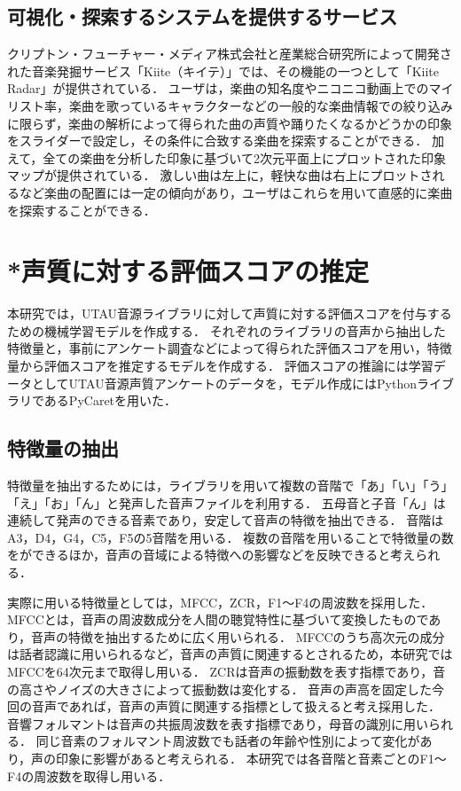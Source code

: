 \documentclass[a4j,8pt,twocolumn]{extarticle}
\begin{document}
\subsection{可視化・探索するシステムを提供するサービス}
クリプトン・フューチャー・メディア株式会社と産業総合研究所によって開発された音楽発掘サービス「Kiite（キイテ）」では、その機能の一つとして「Kiite Radar」が提供されている\cite{kiite}．
ユーザは，楽曲の知名度やニコニコ動画上でのマイリスト率，楽曲を歌っているキャラクターなどの一般的な楽曲情報での絞り込みに限らず，楽曲の解析によって得られた曲の声質や踊りたくなるかどうかの印象をスライダーで設定し，その条件に合致する楽曲を探索することができる．
加えて，全ての楽曲を分析した印象に基づいて2次元平面上にプロットされた印象マップが提供されている．
激しい曲は左上に，軽快な曲は右上にプロットされるなど楽曲の配置には一定の傾向があり，ユーザはこれらを用いて直感的に楽曲を探索することができる．

\section{*声質に対する評価スコアの推定}
本研究では，UTAU音源ライブラリに対して声質に対する評価スコアを付与するための機械学習モデルを作成する．
それぞれのライブラリの音声から抽出した特徴量と，事前にアンケート調査などによって得られた評価スコアを用い，特徴量から評価スコアを推定するモデルを作成する．
評価スコアの推論には学習データとしてUTAU音源声質アンケートのデータを，モデル作成にはPythonライブラリであるPyCaretを用いた．

\subsection{特徴量の抽出}
特徴量を抽出するためには，ライブラリを用いて複数の音階で「あ」「い」「う」「え」「お」「ん」と発声した音声ファイルを利用する．
五母音と子音「ん」は連続して発声のできる音素であり，安定して音声の特徴を抽出できる．
音階はA3，D4，G4，C5，F5の5音階を用いる．
複数の音階を用いることで特徴量の数をができるほか，音声の音域による特徴への影響などを反映できると考えられる．

実際に用いる特徴量としては，MFCC，ZCR，F1〜F4の周波数を採用した．
MFCCとは，音声の周波数成分を人間の聴覚特性に基づいて変換したものであり，音声の特徴を抽出するために広く用いられる．
MFCCのうち高次元の成分は話者認識に用いられるなど，音声の声質に関連するとされる\cite{}ため，本研究ではMFCCを64次元まで取得し用いる．
ZCRは音声の振動数を表す指標であり，音の高さやノイズの大きさによって振動数は変化する．
音声の声高を固定した今回の音声であれば，音声の声質に関連する指標として扱えると考え採用した．
音響フォルマントは音声の共振周波数を表す指標であり，母音の識別に用いられる．
同じ音素のフォルマント周波数でも話者の年齢や性別によって変化があり\cite{formant}，声の印象に影響があると考えられる．
本研究では各音階と音素ごとのF1〜F4の周波数を取得し用いる．
\end{document}
